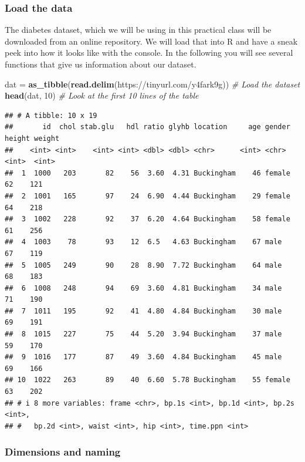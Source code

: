 \documentclass[
]{book}
\newenvironment{Shaded}{\begin{snugshade}}{\end{snugshade}}
\newcommand{\CommentTok}[1]{\textcolor[rgb]{0.56,0.35,0.01}{\textit{#1}}}
\newcommand{\DecValTok}[1]{\textcolor[rgb]{0.00,0.00,0.81}{#1}}
\newcommand{\FunctionTok}[1]{\textcolor[rgb]{0.13,0.29,0.53}{\textbf{#1}}}
\newcommand{\NormalTok}[1]{#1}
\newcommand{\OtherTok}[1]{\textcolor[rgb]{0.56,0.35,0.01}{#1}}
\newcommand{\StringTok}[1]{\textcolor[rgb]{0.31,0.60,0.02}{#1}}
\begin{document}
\hypertarget{load-the-data}{%
\subsubsection{Load the data}\label{load-the-data}}

The diabetes dataset, which we will be using in this practical class will be downloaded from an online repository.
We will load that into R and have a sneak peek into how it looks like with the console.
In the following you will see several functions that give us information about our dataset.

\begin{Shaded}
\begin{Highlighting}[]
\NormalTok{dat }\OtherTok{=} \FunctionTok{as\_tibble}\NormalTok{(}\FunctionTok{read.delim}\NormalTok{(}\StringTok{\textquotesingle{}https://tinyurl.com/y4fark9g\textquotesingle{}}\NormalTok{)) }\CommentTok{\# Load the dataset}
\FunctionTok{head}\NormalTok{(dat, }\DecValTok{10}\NormalTok{) }\CommentTok{\# Look at the first 10 lines of the table}
\end{Highlighting}
\end{Shaded}

\begin{verbatim}
## # A tibble: 10 x 19
##       id  chol stab.glu   hdl ratio glyhb location     age gender height weight
##    <int> <int>    <int> <int> <dbl> <dbl> <chr>      <int> <chr>   <int>  <int>
##  1  1000   203       82    56  3.60  4.31 Buckingham    46 female     62    121
##  2  1001   165       97    24  6.90  4.44 Buckingham    29 female     64    218
##  3  1002   228       92    37  6.20  4.64 Buckingham    58 female     61    256
##  4  1003    78       93    12  6.5   4.63 Buckingham    67 male       67    119
##  5  1005   249       90    28  8.90  7.72 Buckingham    64 male       68    183
##  6  1008   248       94    69  3.60  4.81 Buckingham    34 male       71    190
##  7  1011   195       92    41  4.80  4.84 Buckingham    30 male       69    191
##  8  1015   227       75    44  5.20  3.94 Buckingham    37 male       59    170
##  9  1016   177       87    49  3.60  4.84 Buckingham    45 male       69    166
## 10  1022   263       89    40  6.60  5.78 Buckingham    55 female     63    202
## # i 8 more variables: frame <chr>, bp.1s <int>, bp.1d <int>, bp.2s <int>,
## #   bp.2d <int>, waist <int>, hip <int>, time.ppn <int>
\end{verbatim}

\hypertarget{dimensions-and-naming}{%
\subsubsection{Dimensions and naming}\label{dimensions-and-naming}}
\end{document}
